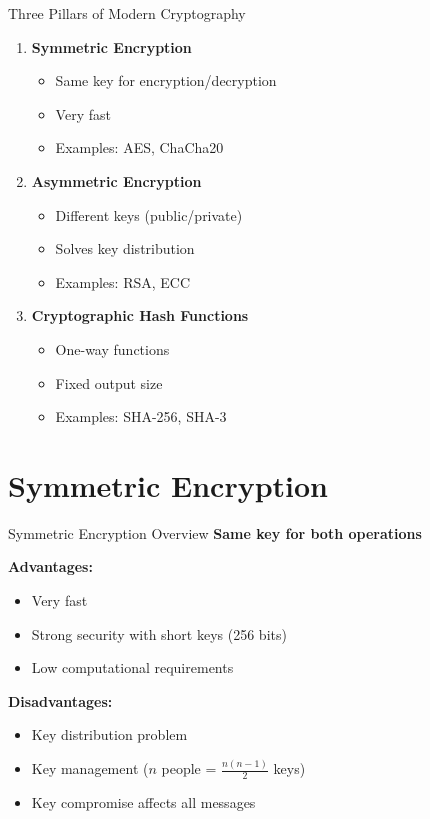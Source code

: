\documentclass{beamer}
\begin{document}
\begin{frame}{Three Pillars of Modern Cryptography}
\begin{enumerate}
    \item<1-> \textbf{Symmetric Encryption}
    \begin{itemize}
        \item Same key for encryption/decryption
        \item Very fast
        \item Examples: AES, ChaCha20
    \end{itemize}

    \item<2-> \textbf{Asymmetric Encryption}
    \begin{itemize}
        \item Different keys (public/private)
        \item Solves key distribution
        \item Examples: RSA, ECC
    \end{itemize}

    \item<3-> \textbf{Cryptographic Hash Functions}
    \begin{itemize}
        \item One-way functions
        \item Fixed output size
        \item Examples: SHA-256, SHA-3
    \end{itemize}
\end{enumerate}

\end{frame}

\section{Symmetric Encryption}

\begin{frame}{Symmetric Encryption Overview}
\textbf{Same key for both operations}\pause

\vspace{0.3cm}
\textbf{Advantages:}
\begin{itemize}
    \item Very fast
    \item Strong security with short keys (256 bits)
    \item Low computational requirements
\end{itemize}
\pause
\vspace{0.3cm}
\textbf{Disadvantages:}
\begin{itemize}
    \item Key distribution problem
    \item Key management ($n$ people = $\frac{n(n-1)}{2}$ keys)
    \item Key compromise affects all messages
\end{itemize}

\end{frame}
\end{document}
